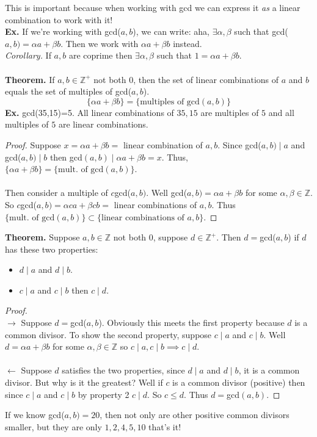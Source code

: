\documentclass[class=article, crop=false]{standalone}
\def\integers{{\mathbb Z}}
\begin{document}
\noindent This is important because when working with gcd we can express it \emph{as} a linear combination to work with it!\\
\textbf{Ex.} If we're working with gcd($a,b$), we can write: aha, $\exists\alpha,\beta$ such that gcd($a,b)=\alpha a+\beta b$.
Then we work with $\alpha a+\beta b$ instead.\\
\emph{Corollary.} If $a,b$ are coprime then $\exists\alpha,\beta$ such that $1=\alpha a+\beta b$.\\\\
\textbf{Theorem.} If $a,b\in\integers^+$ not both 0, then the set of linear combinations of $a$ and $b$ equals the set of multiples
of gcd($a,b$). $$\{\alpha a+\beta b\} = \{\text{multiples of gcd}(a,b)\}$$
\textbf{Ex.} gcd(35,15)=5. All linear combinations of $35,15$ are multiples of $5$ and all multiples of $5$ are linear combinations.\\
\begin{proof}
	Suppose $x=\alpha a+\beta b=$ linear combination of $a,b$. Since gcd($a,b)\mid a$ and gcd($a,b)\mid b$ then
	gcd$(a,b)\mid\alpha a+\beta b= x$. Thus, $\{\alpha a+\beta b\} = \{\text{mult. of gcd}(a,b)\}$.\\\\
	Then consider a multiple of $c$gcd($a,b)$. Well gcd($a,b)=\alpha a+\beta b$ for some $\alpha,\beta\in\integers$.
	So $c$gcd($a,b)=\alpha ca+\beta cb=$ linear combinations of $a,b$. Thus $\{\text{mult. of gcd}(a,b)\}\subset \{\text{linear combinations of } a,b\}$.
\end{proof}
\noindent\textbf{Theorem.} Suppose $a,b\in\integers$ not both 0, suppose $d\in\integers^+$. Then $d=$gcd($a,b$) if
$d$ has these two properties:
\begin{itemize}
	\item $d\mid a$ and $d\mid b$.
	\item $c\mid a$ and $c\mid b$ then $c\mid d$.
\end{itemize}
\begin{proof}
	$ $\\
	$\rightarrow$ Suppose $d=$gcd($a,b$). Obviously this meets the first property because $d$ is a common divisor.
	To show the second property, suppose $c\mid a$ and $c\mid b$. Well $d=\alpha a+\beta b$ for some $\alpha,\beta\in\integers$
	so $c\mid a, c\mid b\implies c\mid d$.\\\\
	$\leftarrow$ Suppose $d$ satisfies the two properties, since $d\mid a$ and $d\mid b$, it is a common divisor. But why is it the greatest?
	Well if $c$ is a common divisor (positive) then since $c\mid a$ and $c\mid b$ by property 2 $c\mid d$. So $c\leq d$.
	Thus $d=$gcd$(a,b)$.
\end{proof}
\noindent If we know gcd($a,b)=20$, then not only are other positive common divisors smaller, but they are only $1,2,4,5,10$ that's it!
\end{document}
